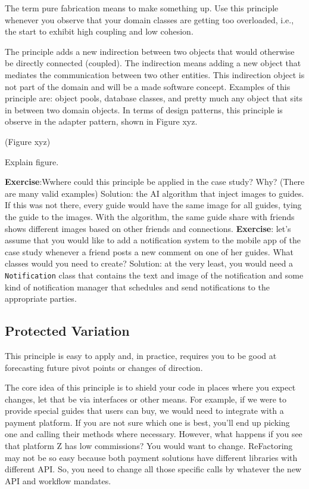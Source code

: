 \documentclass[]{article}
\begin{document}
The term pure fabrication means to make something up. Use this principle
whenever you observe that your domain classes are getting too
overloaded, i.e., the start to exhibit high coupling and low cohesion.

The principle adds a new indirection between two objects that would
otherwise be directly connected (coupled). The indirection means adding
a new object that mediates the communication between two other entities.
This indirection object is not part of the domain and will be a made
software concept. Examples of this principle are: object pools, database
classes, and pretty much any object that sits in between two domain
objects. In terms of design patterns, this principle is observe in the
adapter pattern, shown in Figure xyz.

(Figure xyz)

Explain figure.

\textbf{Exercise}:Wwhere could this principle be applied in the case
study? Why? (There are many valid examples) Solution: the AI algorithm
that inject images to guides. If this was not there, every guide would
have the same image for all guides, tying the guide to the images. With
the algorithm, the same guide share with friends shows different images
based on other friends and connections. \textbf{Exercise}: let's assume
that you would like to add a notification system to the mobile app of
the case study whenever a friend posts a new comment on one of her
guides. What classes would you need to create? Solution: at the very
least, you would need a \texttt{Notification} class that contains the
text and image of the notification and some kind of notification manager
that schedules and send notifications to the appropriate parties.

\subsection{Protected Variation}\label{protected-variation}

This principle is easy to apply and, in practice, requires you to be
good at forecasting future pivot points or changes of direction.

The core idea of this principle is to shield your code in places where
you expect changes, let that be via interfaces or other means. For
example, if we were to provide special guides that users can buy, we
would need to integrate with a payment platform. If you are not sure
which one is best, you'll end up picking one and calling their methods
where necessary. However, what happens if you see that platform Z has
low commissions? You would want to change. ReFactoring may not be so
easy because both payment solutions have different libraries with
different API. So, you need to change all those specific calls by
whatever the new API and workflow mandates.
\end{document}
